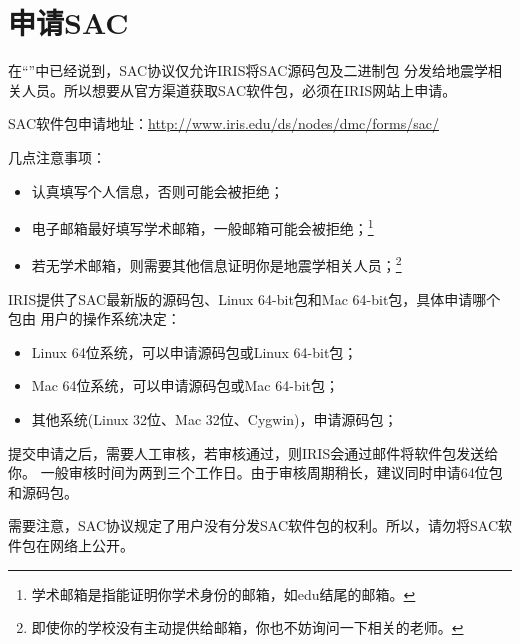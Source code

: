 \section{申请SAC}
在``''中已经说到，SAC协议仅允许IRIS将SAC源码包及二进制包
分发给地震学相关人员。所以想要从官方渠道获取SAC软件包，必须在IRIS网站上申请。

SAC软件包申请地址：\url{http://www.iris.edu/ds/nodes/dmc/forms/sac/}

几点注意事项：
\begin{itemize}
\item 认真填写个人信息，否则可能会被拒绝；
\item 电子邮箱最好填写学术邮箱，一般邮箱可能会被拒绝；\footnote{学术邮箱是指能证明你学术身份的邮箱，如edu结尾的邮箱。}
\item 若无学术邮箱，则需要其他信息证明你是地震学相关人员；\footnote{即使你的学校没有主动提供给邮箱，你也不妨询问一下相关的老师。}
\end{itemize}

IRIS提供了SAC最新版的源码包、Linux 64-bit包和Mac 64-bit包，具体申请哪个包由
用户的操作系统决定：
\begin{itemize}
\item Linux 64位系统，可以申请源码包或Linux 64-bit包；
\item Mac 64位系统，可以申请源码包或Mac 64-bit包；
\item 其他系统(Linux 32位、Mac 32位、Cygwin)，申请源码包；
\end{itemize}

提交申请之后，需要人工审核，若审核通过，则IRIS会通过邮件将软件包发送给你。
一般审核时间为两到三个工作日。由于审核周期稍长，建议同时申请64位包和源码包。

需要注意，SAC协议规定了用户没有分发SAC软件包的权利。所以，请勿将SAC软件包在网络上公开。

